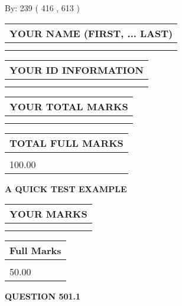 \documentclass[12pt]{article}
\begin{document}
   
\hspace{1.0in} By: 
 239 ( 416 ,  613 )
   
   
   
   
\newpage 
\setcounter{page}{ 
   501001 } 
   
   
   
   
\noindent\begin{tabular}{|l|}
\hline
YOUR NAME (FIRST, ... LAST)  \\
\hline
 \\ 
 \\ 
\hline
\end{tabular}
\hspace{0.05in} \begin{tabular}{|l|}
\hline
 YOUR   ID   INFORMATION  \\
\hline
 \\ 
 \\ 
\hline
\end{tabular}
   
   
\vspace{0.2in}\noindent\begin{tabular}{|l|}
\hline
YOUR TOTAL MARKS  \\
\hline
 \\ 
 \\ 
\hline
\end{tabular}
\hspace{0.05in} \begin{tabular}{|l|}
\hline
TOTAL FULL MARKS  \\
\hline
 \\ 
100.00 \\
\hline
\end{tabular}
   
   
 \vspace{0.2in}
{\LARGE {\textbf{ A QUICK TEST EXAMPLE}}}
   
   
  
\vspace{0.2in}
  
\noindent\begin{tabular}{|l|}
\hline
 YOUR MARKS  \\
\hline
 \\ 
 \\ 
\hline
\end{tabular}
\hspace{0.05in} \begin{tabular}{|l|}
\hline
 Full Marks  \\
\hline
 \\ 
50.00 \\
\hline
\end{tabular}
{\textbf{\Large{QUESTION
501.1 
}}}
  
\end{document}

